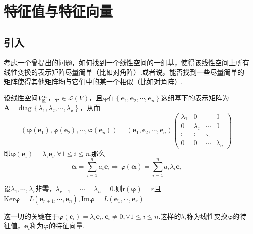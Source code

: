 \section{特征值与特征向量}
\subsection{引入}
考虑一个曾提出的问题，如何找到一个线性空间的一组基，使得该线性空间上所有线性变换的表示矩阵尽量简单（比如对角阵）.或者说，能否找到一些尽量简单的矩阵使得其他矩阵均与它们中的某一个相似（比如对角阵）.

设线性空间$V_{\mathbb{K}}^n$，$\bm{\varphi}\in\mathcal{L}\left(V\right)$，且$\bm{\varphi}$在$\left\{
    \bm{e}_1,\bm{e}_2,\cdots,\bm{e}_n
    \right\}$这组基下的表示矩阵为$\bm{A}=\mathrm{diag}\,\left\{
    \lambda_1,\lambda_2,\cdots,\lambda_n
    \right\}$，从而
\[
    \left(
    \bm{\varphi}\left(\bm{e}_1\right),\bm{\varphi}\left(\bm{e}_2\right),\cdots,\bm{\varphi}\left(\bm{e}_n\right)
    \right)=
    \left(
    \bm{e}_1,\bm{e}_2,\cdots,\bm{e}_n
    \right)\begin{pmatrix}
        \lambda_1 & 0         & \cdots & 0         \\
        0         & \lambda_2 & \cdots & 0         \\
        \vdots    & \vdots    & \ddots & \vdots    \\
        0         & 0         & \cdots & \lambda_n
    \end{pmatrix}
\]即$\bm{\varphi}\left(
    \bm{e}_i
    \right)=\lambda_i\bm{e}_i,\forall 1\leqslant i\leqslant n.$那么
\[
    \bm{\alpha}= \sum_{i=1}^{n} a_i\bm{e}_i\Longrightarrow
    \bm{\varphi}\left(
    \bm{\alpha}
    \right)=\sum_{i=1}^{n}a_i\lambda_i
    \bm{e}_i
\]

设$\lambda_1,\cdots,\lambda_r$非零，$
    \lambda_{r+1}=\cdots=\lambda_n=0.$则$\mathrm{r}\left(
    \bm{\varphi}
    \right)=r$且$\mathrm{Ker}\bm{\varphi}=L\left(
    \bm{e}_{r+1},\cdots,\bm{e}_n
    \right),\mathrm{Im}\bm{\varphi}=L\left(
    \bm{e}_1,\cdots,\bm{e}_r
    \right)$.

这一切的关键在于$
    \bm{\varphi}\left(
    \bm{e}_i
    \right)=\lambda_i\bm{e}_i,\bm{e}_i\neq 0,\forall 1\leqslant i\leqslant n
$.这样的$\lambda_i$称为线性变换$\bm{\varphi}$的特征值，$\bm{e}_i$称为$\bm{\varphi}$的特征向量.
